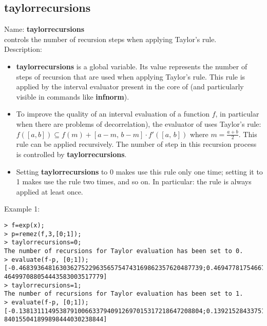 \subsection{taylorrecursions}
\label{labtaylorrecursions}
\noindent Name: \textbf{taylorrecursions}\\
controls the number of recursion steps when applying Taylor's rule.\\
\noindent Description: \begin{itemize}

\item \textbf{taylorrecursions} is a global variable. Its value represents the number of steps
   of recursion that are used when applying Taylor's rule. This rule is applied
   by the interval evaluator present in the core of \sollya (and particularly
   visible in commands like \textbf{infnorm}).

\item To improve the quality of an interval evaluation of a function $f$, in 
   particular when there are problems of decorrelation), the evaluator of \sollya
   uses Taylor's rule:  $f([a,b]) \subseteq f(m) + [a-m,\,b-m] \cdot f'([a,\,b])$ where $m=\frac{a+b}{2}$.
   This rule can be applied recursively.
   The number of step in this recursion process is controlled by \textbf{taylorrecursions}.

\item Setting \textbf{taylorrecursions} to 0 makes \sollya use this rule only one time;
   setting it to 1 makes \sollya use the rule two times, and so on.
   In particular: the rule is always applied at least once.
\end{itemize}
\noindent Example 1: 
\begin{center}\begin{minipage}{15cm}\begin{Verbatim}[frame=single]
> f=exp(x);
> p=remez(f,3,[0;1]);
> taylorrecursions=0;
The number of recursions for Taylor evaluation has been set to 0.
> evaluate(f-p, [0;1]);
[-0.46839364816303627522963565754743169862357620487739;0.46947781754667086491682
464997088054443583003517779]
> taylorrecursions=1;
The number of recursions for Taylor evaluation has been set to 1.
> evaluate(f-p, [0;1]);
[-0.13813111495387910066337940912697015317218647208804;0.13921528433751369035056
840155041899898444030238844]
\end{Verbatim}
\end{minipage}\end{center}
